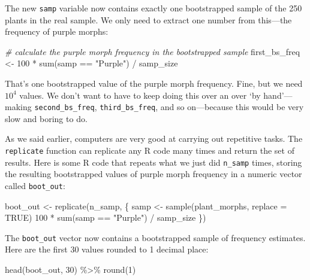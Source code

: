 \documentclass[
]{book}
\newenvironment{Shaded}{\begin{snugshade}}{\end{snugshade}}
\newcommand{\AttributeTok}[1]{\textcolor[rgb]{0.77,0.63,0.00}{#1}}
\newcommand{\CommentTok}[1]{\textcolor[rgb]{0.56,0.35,0.01}{\textit{#1}}}
\newcommand{\ConstantTok}[1]{\textcolor[rgb]{0.00,0.00,0.00}{#1}}
\newcommand{\DecValTok}[1]{\textcolor[rgb]{0.00,0.00,0.81}{#1}}
\newcommand{\FunctionTok}[1]{\textcolor[rgb]{0.00,0.00,0.00}{#1}}
\newcommand{\NormalTok}[1]{#1}
\newcommand{\OtherTok}[1]{\textcolor[rgb]{0.56,0.35,0.01}{#1}}
\newcommand{\SpecialCharTok}[1]{\textcolor[rgb]{0.00,0.00,0.00}{#1}}
\newcommand{\StringTok}[1]{\textcolor[rgb]{0.31,0.60,0.02}{#1}}
\begin{document}
The new \texttt{samp} variable now contains exactly one bootstrapped sample of the 250 plants in the real sample. We only need to extract one number from this---the frequency of purple morphs:

\begin{Shaded}
\begin{Highlighting}[]
\CommentTok{\# calculate the purple morph frequency in the bootstrapped sample}
\NormalTok{first\_bs\_freq }\OtherTok{\textless{}{-}} \DecValTok{100} \SpecialCharTok{*} \FunctionTok{sum}\NormalTok{(samp }\SpecialCharTok{==} \StringTok{"Purple"}\NormalTok{) }\SpecialCharTok{/}\NormalTok{ samp\_size}
\end{Highlighting}
\end{Shaded}

That's one bootstrapped value of the purple morph frequency. Fine, but we need \(\ensuremath{10^{4}}\) values. We don't want to have to keep doing this over an over `by hand'---making \texttt{second\_bs\_freq}, \texttt{third\_bs\_freq}, and so on---because this would be very slow and boring to do.

As we said earlier, computers are very good at carrying out repetitive tasks. The \texttt{replicate} function can replicate any R code many times and return the set of results. Here is some R code that repeats what we just did \texttt{n\_samp} times, storing the resulting bootstrapped values of purple morph frequency in a numeric vector called \texttt{boot\_out}:

\begin{Shaded}
\begin{Highlighting}[]
\NormalTok{boot\_out }\OtherTok{\textless{}{-}} \FunctionTok{replicate}\NormalTok{(n\_samp, \{}
\NormalTok{  samp }\OtherTok{\textless{}{-}} \FunctionTok{sample}\NormalTok{(plant\_morphs, }\AttributeTok{replace =} \ConstantTok{TRUE}\NormalTok{)}
  \DecValTok{100} \SpecialCharTok{*} \FunctionTok{sum}\NormalTok{(samp }\SpecialCharTok{==} \StringTok{"Purple"}\NormalTok{) }\SpecialCharTok{/}\NormalTok{ samp\_size}
\NormalTok{\})}
\end{Highlighting}
\end{Shaded}

The \texttt{boot\_out} vector now contains a bootstrapped sample of frequency estimates. Here are the first 30 values rounded to 1 decimal place:

\begin{Shaded}
\begin{Highlighting}[]
\FunctionTok{head}\NormalTok{(boot\_out, }\DecValTok{30}\NormalTok{) }\SpecialCharTok{\%\textgreater{}\%} \FunctionTok{round}\NormalTok{(}\DecValTok{1}\NormalTok{)}
\end{Highlighting}
\end{Shaded}
\end{document}
